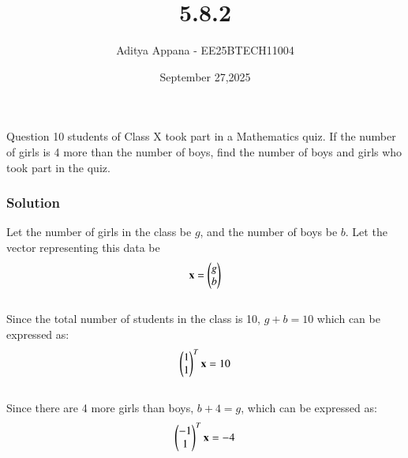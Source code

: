 \documentclass{beamer}
\title %
{5.8.2}
\date{September 27,2025}
\author %
{Aditya Appana - EE25BTECH11004}
\begin{document}
\frame{\titlepage}
\begin{frame}{Question}
10 students of Class X took part in a Mathematics quiz. If the number of girls is 4
more than the number of boys, find the number of boys and girls who took part in
the quiz.
\end{frame}



\begin{frame}[fragile]
    \frametitle{Solution}
Let the number of girls in the class be $g$, and the number of boys be $b$. Let the vector representing this data be 
\begin{align}
\mathbf{x} = \begin{pmatrix}g\\b\end{pmatrix}    
\end{align}\\
Since the total number of students in the class is 10, $g+b=10$ which can be expressed as:
\begin{align}
\begin{pmatrix}1\\1\end{pmatrix}^T\mathbf{x} = 10
\end{align}\\
Since there are 4 more girls than boys, $b+4=g$, which can be expressed as:
\begin{align}
\begin{pmatrix}-1 \\ 1\end{pmatrix}^T\mathbf{x} = -4
\end{align}\\

\end{frame}
\end{document}
